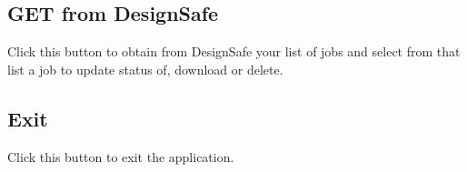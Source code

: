 \subsection{GET from DesignSafe}
Click this button to obtain from DesignSafe your list of jobs and
select from that list a job to update status of, download or delete.

\subsection{Exit}
Click this button to exit the application. 
